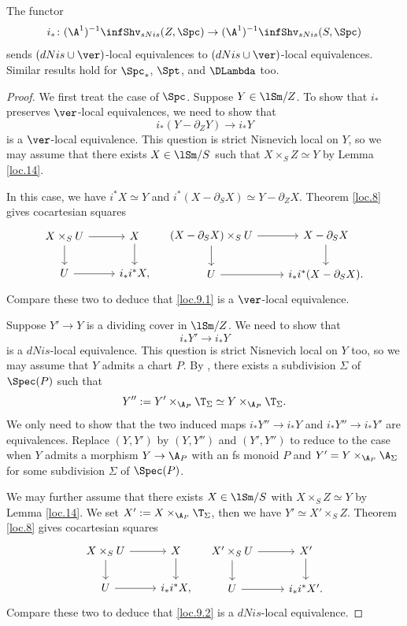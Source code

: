 \documentclass[10pt]{amsart}
\begin{document}
\begin{lem}
\label{loc.9}
The functor
\[
i_*
\colon
(\A^1)^{-1}\infShv_{sNis}(Z,\Spc)
\to
(\A^1)^{-1}\infShv_{sNis}(S,\Spc)
\]
sends $(dNis\cup\ver)$-local equivalences to $(dNis\cup\ver)$-local equivalences.
Similar results hold for $\Spc_*$, $\Spt$, and $\DLambda$ too.
\end{lem}
\begin{proof}
We first treat the case of $\Spc$.
Suppose $Y\in \lSm/Z$.
To show that $i_*$ preserves $\ver$-local equivalences, we need to show that
\begin{equation}
\label{loc.9.1}
i_*(Y-\partial_Z Y)\to i_*Y
\end{equation}
is a $\ver$-local equivalence.
This question is strict Nisnevich local on $Y$, so we may assume that there exists $X\in \lSm/S$ such that $X\times_S Z\simeq Y$ by Lemma \ref{loc.14}.

In this case, we have $i^*X\simeq Y$ and $i^*(X-\partial_S X)\simeq Y-\partial_Z X$.
Theorem \ref{loc.8} gives cocartesian squares
\[
\begin{tikzcd}
X\times_S U\ar[d]\ar[r]&
X\ar[d]
\\
U\ar[r]&
i_*i^*X,
\end{tikzcd}
\quad
\begin{tikzcd}
(X-\partial_S X)\times_S U\ar[d]\ar[r]&
X-\partial_S X\ar[d]
\\
U\ar[r]&
i_*i^*(X-\partial_S X).
\end{tikzcd}
\]
Compare these two to deduce that \eqref{loc.9.1} is a $\ver$-local equivalence.

Suppose $Y'\to Y$ is a dividing cover in $\lSm/Z$.
We need to show that
\begin{equation}
\label{loc.9.2}
i_*Y'\to i_*Y
\end{equation}
is a $dNis$-local equivalence.
This question is strict Nisnevich local on $Y$ too, so we may assume that $Y$ admits a chart $P$.
By \cite[Proposition A.11.5]{logDM}, there exists a subdivision $\Sigma$ of $\Spec(P)$ such that 
\[
Y'':=Y'\times_{\A_P}\T_\Sigma
\simeq
Y\times_{\A_P}\T_\Sigma.
\]
We only need to show that the two induced maps $i_*Y''\to i_*Y$ and $i_*Y''\to i_*Y'$ are equivalences.
Replace $(Y,Y')$ by $(Y,Y'')$ and $(Y',Y'')$ to reduce to the case when $Y$ admits a morphism $Y\to \A_P$ with an fs monoid $P$ and $Y'=Y\times_{\A_P}\A_\Sigma$ for some subdivision $\Sigma$ of $\Spec(P)$.

We may further assume that there exists $X\in \lSm/S$ with $X\times_S Z\simeq Y$ by Lemma \ref{loc.14}.
We set $X':=X\times_{\A_P}\T_\Sigma$, then we have $Y'\simeq X'\times_S Z$.
Theorem \ref{loc.8} gives cocartesian squares
\[
\begin{tikzcd}
X\times_S U\ar[d]\ar[r]&
X\ar[d]
\\
U\ar[r]&
i_*i^*X,
\end{tikzcd}
\quad
\begin{tikzcd}
X'\times_S U\ar[d]\ar[r]&
X'\ar[d]
\\
U\ar[r]&
i_*i^*X'.
\end{tikzcd}
\]
Compare these two to deduce that \eqref{loc.9.2} is a $dNis$-local equivalence.


\end{proof}
\end{document}
